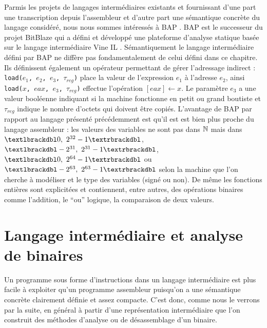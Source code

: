Parmis les projets de langages intermédiaires existants et fournissant d'une part une transcription depuis l'assembleur et d'autre part une sémantique concrète du langage considéré, nous nous sommes intéressés à BAP \cite{BAP11}. 
BAP est le successeur du projet BitBlaze qui a défini et développé une plateforme d'analyse statique basée sur le langage intermédiaire Vine IL \cite{bitblaze08}. 
Sémantiquement le langage intermédiaire défini par BAP ne diffère pas fondamentalement de celui défini dans ce chapitre. 
Ils définissent également un opérateur permettant de gérer l'adressage indirect : \texttt{load($e_1$, $e_2$, $e_3$, $\tau_{reg}$)} place la valeur de l'expression $e_1$ à l'adresse $e_2$, ainsi \texttt{load($x$, $eax$, $e_3$, $\tau_{reg}$)} effectue l'opération \texttt{$[eax]\leftarrow x$}. 
Le paramètre $e_3$ a une valeur booléenne indiquant si la machine fonctionne en petit ou grand boutiste et $\tau_{reg}$ indique le nombre d'octets qui doivent être copiés. 
L'avantage de BAP par rapport au langage présenté précédemment est qu'il est est bien plus proche du langage assembleur : les valeurs des variables ne sont pas dans $\mathbb N$ mais dans $\textlbrackdbl 0,\ 2^{32}-1\textrbrackdbl$, $\textlbrackdbl -2^{31},\ 2^{31}-1\textrbrackdbl$, $\textlbrackdbl 0,\ 2^{64}-1\textrbrackdbl$ ou $\textlbrackdbl -2^{63},\ 2^{63}-1\textrbrackdbl$ selon la machine que l'on cherche à modéliser et le type des variables (signé ou non). 
De même les fonctions entières sont explicitées et contiennent, entre autres, des opérations binaires comme l'addition, le ``ou'' logique, la comparaison de deux valeurs.


\section{Langage intermédiaire et analyse de binaires}
Un programme sous forme d'instructions dans un langage intermédiaire est plus facile à exploiter qu'un programme assembleur puisqu'on a une sémantique concrète clairement définie et assez compacte.
C'est donc, comme nous le verrons par la suite, en général à partir d'une représentation intermédiaire que l'on construit des méthodes d'analyse ou de désassemblage d'un binaire.

